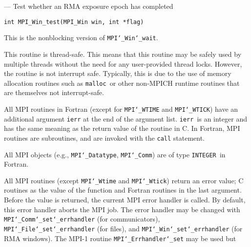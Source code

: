 \startmanpage
{}
--- Test whether an RMA exposure epoch has completed 
\startvb\begin{verbatim}
int MPI_Win_test(MPI_Win win, int *flag)

\end{verbatim}
\endvb

\par
{}
\par
{}
This is the nonblocking version of {\tt MPI{\tt \char`\_}Win{\tt \char`\_}wait}.
\par
{}
\par
This routine is thread-safe.  This means that this routine may be
safely used by multiple threads without the need for any user-provided
thread locks.  However, the routine is not interrupt safe.  Typically,
this is due to the use of memory allocation routines such as {\tt malloc
}or other non-MPICH runtime routines that are themselves not interrupt-safe.
\par
{}
All MPI routines in Fortran (except for {\tt MPI{\tt \char`\_}WTIME} and {\tt MPI{\tt \char`\_}WTICK}) have
an additional argument {\tt ierr} at the end of the argument list.  {\tt ierr
}is an integer and has the same meaning as the return value of the routine
in C.  In Fortran, MPI routines are subroutines, and are invoked with the
{\tt call} statement.
\par
All MPI objects (e.g., {\tt MPI{\tt \char`\_}Datatype}, {\tt MPI{\tt \char`\_}Comm}) are of type {\tt INTEGER
}in Fortran.
\par
{}
\par
All MPI routines (except {\tt MPI{\tt \char`\_}Wtime} and {\tt MPI{\tt \char`\_}Wtick}) return an error value;
C routines as the value of the function and Fortran routines in the last
argument.  Before the value is returned, the current MPI error handler is
called.  By default, this error handler aborts the MPI job.  The error handler
may be changed with {\tt MPI{\tt \char`\_}Comm{\tt \char`\_}set{\tt \char`\_}errhandler} (for communicators),
{\tt MPI{\tt \char`\_}File{\tt \char`\_}set{\tt \char`\_}errhandler} (for files), and {\tt MPI{\tt \char`\_}Win{\tt \char`\_}set{\tt \char`\_}errhandler} (for
RMA windows).  The MPI-1 routine {\tt MPI{\tt \char`\_}Errhandler{\tt \char`\_}set} may be used but
